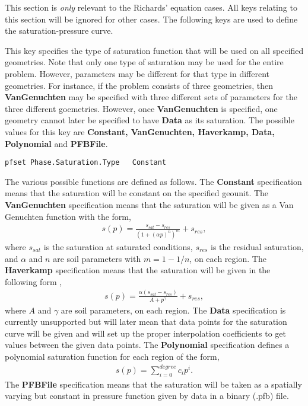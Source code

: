 This section is {\em only} relevant to the Richards' equation cases.  All keys
relating to this section will be ignored for other cases.
The following keys are used to define the saturation-pressure curve.

{
This key specifies the type of saturation function that will be used
on all specified geometries.  Note that only one type of saturation
may be used for the entire problem.  However, parameters may be different for
that type in different geometries.  For instance, if the problem consists of
three geometries, then {\bf VanGenuchten} may be specified with three different
sets of parameters for the three different goemetries.  However, once {\bf
VanGenuchten} is specified, one geometry cannot later be specified to have {\bf
Data} as its saturation.  The possible values for this key 
are {\bf Constant, VanGenuchten, Haverkamp, Data, Polynomial} and 
{\bf PFBFile}.
}
\begin{display}\begin{verbatim}
pfset Phase.Saturation.Type   Constant
\end{verbatim}\end{display}

The various possible functions are defined as follows.
The {\bf Constant} specification means that the saturation will be
constant on the specified geounit.  The {\bf VanGenuchten} specification means
that the saturation will be given as a Van Genuchten function 
\cite{VanGenuchten80} with the form,
\begin{eqnarray}
s(p) = \frac{s_{sat} - s_{res}}{(1 + (\alpha p)^n)^m} + s_{res},
\end{eqnarray}
where $s_{sat}$ is the saturation at saturated conditions, 
$s_{res}$ is the residual saturation, and
$\alpha$ and $n$ are soil parameters with $m = 1 - 1/n$, on each region.
The {\bf Haverkamp} specification means that the saturation will be
given in the following form \cite{Haverkamp-Vauclin81},
\begin{eqnarray}
s(p) = \frac{\alpha(s_{sat} - s_{res})}{A + p^{\gamma}} + s_{res},
\end{eqnarray}
where $A$ and $\gamma$ are soil parameters, on each region.
The {\bf Data} specification is currently unsupported but will later mean that
data points for the saturation curve will be given and \parflow{}
will set up the proper interpolation coefficients to get values between the
given data points.
The {\bf Polynomial} specification
defines a polynomial saturation function for each region of the form,
\begin{eqnarray}
s(p) = \sum_{i=0}^{degree} c_ip^i.
\end{eqnarray}
The {\bf PFBFile} specification means that the saturation will be taken as a
spatially varying but constant in pressure function given by data in a
\parflow{} binary (.pfb) file.  

